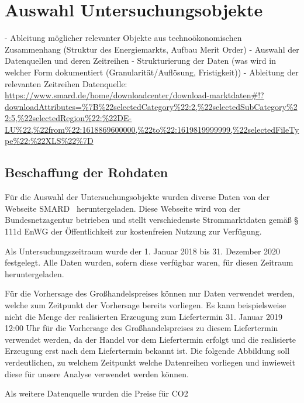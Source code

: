 \section{Auswahl Untersuchungsobjekte}
-	Ableitung möglicher relevanter Objekte aus technoökonomischen Zusammenhang (Struktur des Energiemarkts, Aufbau Merit Order)
-	Auswahl der Datenquellen und deren Zeitreihen
-	Strukturierung der Daten (was wird in welcher Form dokumentiert (Granularität/Auflösung, Fristigkeit))
-	Ableitung der relevanten Zeitreihen
Datenquelle: \url{https://www.smard.de/home/downloadcenter/download-marktdaten#!?downloadAttributes=%7B%22selectedCategory%22:2,%22selectedSubCategory%22:5,%22selectedRegion%22:%22DE-LU%22,%22from%22:1618869600000,%22to%22:1619819999999,%22selectedFileType%22:%22XLS%22%7D}

\subsection{Beschaffung der Rohdaten}
Für die Auswahl der Untersuchungsobjekte wurden diverse Daten von der Webseite SMARD  heruntergeladen. Diese Webseite wird von der Bundesnetzagentur betrieben und stellt verschiedenste Strommarktdaten gemäß § 111d EnWG  der Öffentlichkeit zur kostenfreien Nutzung zur Verfügung.


Als Untersuchungszeitraum wurde der 1. Januar 2018 bis 31. Dezember 2020 festgelegt. Alle Daten wurden, sofern diese verfügbar waren, für diesen Zeitraum heruntergeladen.

Für die Vorhersage des Großhandelspreises können nur Daten verwendet werden, welche zum Zeitpunkt der Vorhersage bereits vorliegen. Es kann beispielsweise nicht die Menge der realisierten Erzeugung zum Liefertermin 31. Januar 2019 12:00 Uhr für die Vorhersage des Großhandelspreises zu diesem Liefertermin verwendet werden, da der Handel vor dem Liefertermin erfolgt und die realisierte Erzeugung erst nach dem Liefertermin bekannt ist. Die folgende Abbildung soll verdeutlichen, zu welchem Zeitpunkt welche Datenreihen vorliegen und inwieweit diese für unsere Analyse verwendet werden können.


Als weitere Datenquelle wurden die Preise für CO2

